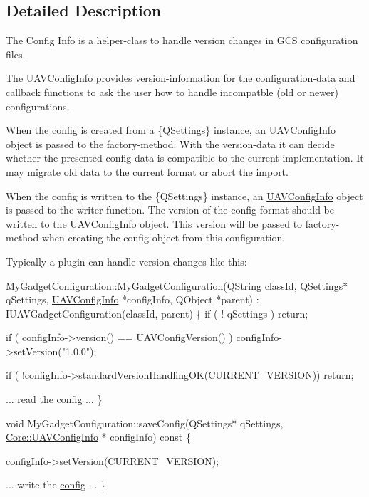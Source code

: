 \subsection{Detailed Description}
The Config Info is a helper-\/class to handle version changes in G\-C\-S configuration files. 

The \hyperlink{class_core_1_1_u_a_v_config_info}{U\-A\-V\-Config\-Info} provides version-\/information for the configuration-\/data and callback functions to ask the user how to handle incompatble (old or newer) configurations.

When the config is created from a \{Q\-Settings\} instance, an \hyperlink{class_core_1_1_u_a_v_config_info}{U\-A\-V\-Config\-Info} object is passed to the factory-\/method. With the version-\/data it can decide whether the presented config-\/data is compatible to the current implementation. It may migrate old data to the current format or abort the import.

When the config is written to the \{Q\-Settings\} instance, an \hyperlink{class_core_1_1_u_a_v_config_info}{U\-A\-V\-Config\-Info} object is passed to the writer-\/function. The version of the config-\/format should be written to the \hyperlink{class_core_1_1_u_a_v_config_info}{U\-A\-V\-Config\-Info} object. This version will be passed to factory-\/method when creating the config-\/object from this configuration.

Typically a plugin can handle version-\/changes like this\-: 
\begin{DoxyCode}
MyGadgetConfiguration::MyGadgetConfiguration(\hyperlink{group___u_a_v_objects_plugin_gab9d252f49c333c94a72f97ce3105a32d}{QString} classId, QSettings* qSettings, 
      \hyperlink{group___core_plugin_gacf5020eb455875fe2ce543b2e8d24315}{UAVConfigInfo} *configInfo, QObject *parent) :
    IUAVGadgetConfiguration(classId, parent)
\{
    \textcolor{keywordflow}{if} ( ! qSettings )
        \textcolor{keywordflow}{return};

    \textcolor{keywordflow}{if} ( configInfo->version() == UAVConfigVersion() )
        configInfo->setVersion(\textcolor{stringliteral}{"1.0.0"});

    \textcolor{keywordflow}{if} ( !configInfo->standardVersionHandlingOK(CURRENT\_VERSION))
        \textcolor{keywordflow}{return};

    ... read the \hyperlink{structconfig__s}{config} ...
\}

\textcolor{keywordtype}{void} MyGadgetConfiguration::saveConfig(QSettings* qSettings, \hyperlink{class_core_1_1_u_a_v_config_info}{Core::UAVConfigInfo} *
      configInfo)\textcolor{keyword}{ const }\{

    configInfo->\hyperlink{group___core_plugin_ga3ea89d37d0ba1f4c972006e6b761c922}{setVersion}(CURRENT\_VERSION);

    ... write the \hyperlink{structconfig__s}{config} ...
\}
\end{DoxyCode}


